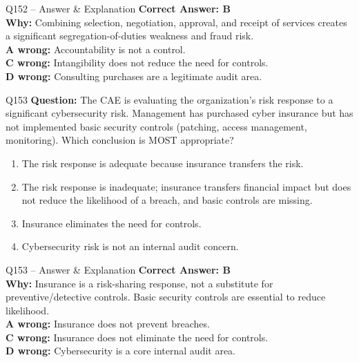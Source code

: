 \documentclass[aspectratio=169,10pt]{beamer}
\begin{document}
	\begin{frame}[t]{Q152 -- Answer \& Explanation}
		\small
		\textbf{Correct Answer: B} \\[4pt]
		\textbf{Why:} Combining selection, negotiation, approval, and receipt of services creates a significant segregation-of-duties weakness and fraud risk. \\[4pt]
		\textbf{A wrong:} Accountability is not a control. \\[2pt]
		\textbf{C wrong:} Intangibility does not reduce the need for controls. \\[2pt]
		\textbf{D wrong:} Consulting purchases are a legitimate audit area.
	\end{frame}
	
	\begin{frame}[t]{Q153}
		\small
		\textbf{Question:} The CAE is evaluating the organization's risk response to a significant cybersecurity risk. Management has purchased cyber insurance but has not implemented basic security controls (patching, access management, monitoring). Which conclusion is MOST appropriate?
		\begin{enumerate}[label=\Alph*.,itemsep=1pt,topsep=2pt]
			\item The risk response is adequate because insurance transfers the risk.
			\item The risk response is inadequate; insurance transfers financial impact but does not reduce the likelihood of a breach, and basic controls are missing.
			\item Insurance eliminates the need for controls.
			\item Cybersecurity risk is not an internal audit concern.
		\end{enumerate}
	\end{frame}
	
	\begin{frame}[t]{Q153 -- Answer \& Explanation}
		\small
		\textbf{Correct Answer: B} \\[4pt]
		\textbf{Why:} Insurance is a risk-sharing response, not a substitute for preventive/detective controls. Basic security controls are essential to reduce likelihood. \\[4pt]
		\textbf{A wrong:} Insurance does not prevent breaches. \\[2pt]
		\textbf{C wrong:} Insurance does not eliminate the need for controls. \\[2pt]
		\textbf{D wrong:} Cybersecurity is a core internal audit area.
	\end{frame}
	
\end{document}
